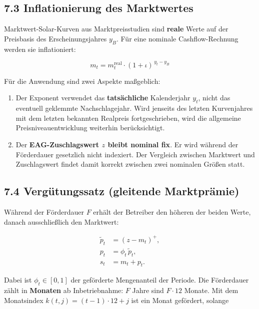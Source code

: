 \documentclass[
  a4paper,
  10pt]{article}
\providecommand{\tightlist}{%
  \setlength{\itemsep}{0pt}\setlength{\parskip}{0pt}}
\begin{document}
\hypertarget{inflationierung-des-marktwertes}{%
\subsection{7.3 Inflationierung des
Marktwertes}\label{inflationierung-des-marktwertes}}

Marktwert-Solar-Kurven aus Marktpreisstudien sind \textbf{reale} Werte
auf der Preisbasis des Erscheinungsjahres \(y_B\). Für eine nominale
Cashflow-Rechnung werden sie inflationiert:

\[ m_t = m^{\mathrm{real}}_t \cdot (1 + \iota)^{\,y_t - y_B} \]

Für die Anwendung sind zwei Aspekte maßgeblich:

\begin{enumerate}
\def\labelenumi{\arabic{enumi}.}
\tightlist
\item
  Der Exponent verwendet das \textbf{tatsächliche} Kalenderjahr \(y_t\),
  nicht das eventuell geklemmte Nachschlagejahr. Wird jenseits des
  letzten Kurvenjahres mit dem letzten bekannten Realpreis
  fortgeschrieben, wird die allgemeine Preisniveauentwicklung weiterhin
  berücksichtigt.
\item
  Der \textbf{EAG-Zuschlagswert \(z\) bleibt nominal fix}. Er wird
  während der Förderdauer gesetzlich nicht indexiert. Der Vergleich
  zwischen Marktwert und Zuschlagswert findet damit korrekt zwischen
  zwei nominalen Größen statt.
\end{enumerate}

\hypertarget{verguxfctungssatz-gleitende-marktpruxe4mie}{%
\subsection{7.4 Vergütungssatz (gleitende
Marktprämie)}\label{verguxfctungssatz-gleitende-marktpruxe4mie}}

Während der Förderdauer \(F\) erhält der Betreiber den höheren der
beiden Werte, danach ausschließlich den Marktwert:

\[
\begin{aligned}
\widetilde{p}_t &= \left(z-m_t\right)^+,\\
p_t &= \phi_t\,\widetilde{p}_t,\\
s_t &= m_t+p_t.
\end{aligned}
\]

Dabei ist \(\phi_t \in [0,1]\) der geförderte Mengenanteil der Periode.
Die Förderdauer zählt in \textbf{Monaten} ab Inbetriebnahme: \(F\) Jahre
sind \(F \cdot 12\) Monate. Mit dem Monatsindex
\(k(t,j) = (t-1)\cdot 12 + j\) ist ein Monat gefördert, solange
\end{document}
